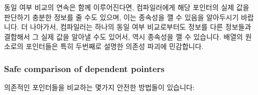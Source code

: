 동일 여부 비교의 연속은 함께 이루어진다면, 컴파일러에게 해당 포인터의 실제 값을
판단하기 충분한 정보를 줄 수도 있으며, 이는 종속성을 깰 수 있음을 알아두시기
바랍니다.
더 나아가서, 컴파일러는 하나의 동일 여부 비교로부터도 정보를 다른 정보들과
결합해서 그 실제 값을 알아낼 수도 있어서, 역시 종속성을 깰 수 있습니다.
배열의 원소로의 포인터들은 특히 두번째로 설명한 의존성 파괴에 민감합니다.

\subsubsection{Safe comparison of dependent pointers}
의존적인 포인터들을 비교하는 몇가지 안전한 방법들이 있습니다:

